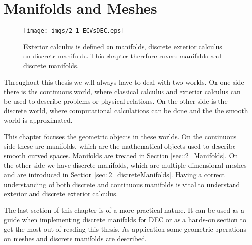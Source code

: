 \chapter{Manifolds and Meshes}

\begin{figure}[h]
\begin{center}
\texttt{[image: imgs/2\_1\_ECVsDEC.eps]}
\end{center}
\vspace{-0.5cm}
\caption{Exterior calculus is defined on manifolds, discrete exterior calculus on discrete manifolds. This chapter therefore covers manifolds and discrete manifolds.}
\end{figure}

Throughout this thesis we will always have to deal with two worlds. On one side there is the continuous world, where classical calculus and exterior calculus can be used to describe problems or physical relations. On the other side is the discrete world, where computational calculations can be done and the the smooth world is approximated.

This chapter focuses the geometric objects in these worlds. On the continuous side these are manifolds, which are the mathematical objects used to describe smooth curved spaces. Manifolds are treated in Section \ref{sec::2_Manifolds}. On the other side we have discrete manifolds, which are multiple dimensional meshes and are introduced in Section \ref{sec::2_discreteManifolds}. Having a correct  understanding of both discrete and continuous manifolds is vital to understand exterior and discrete exterior calculus.

The last section of this chapter is of a more practical nature. It can be used as a guide when implementing discrete manifolds for DEC or as a hands-on section to get the most out of reading this thesis. As application some geometric operations on meshes and discrete manifolds are described.



